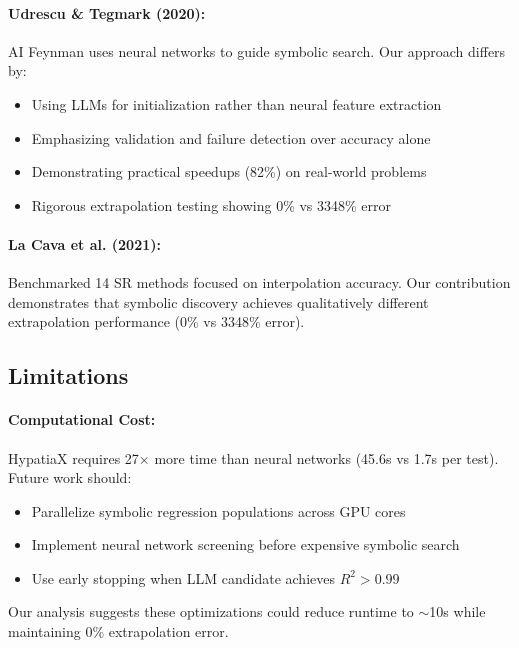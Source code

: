 \documentclass[twoside,11pt]{article}
\begin{document}
\paragraph{Udrescu \& Tegmark (2020):} AI Feynman uses neural networks to guide symbolic search. Our approach differs by:
\begin{itemize}
\item Using LLMs for initialization rather than neural feature extraction
\item Emphasizing validation and failure detection over accuracy alone
\item Demonstrating practical speedups (82\%) on real-world problems
\item Rigorous extrapolation testing showing 0\% vs 3348\% error
\end{itemize}

\paragraph{La Cava et al. (2021):} Benchmarked 14 SR methods focused on interpolation accuracy. Our contribution demonstrates that symbolic discovery achieves qualitatively different extrapolation performance (0\% vs 3348\% error).


\subsection{Limitations}

\paragraph{Computational Cost:} HypatiaX requires 27$\times$ more time than neural networks (45.6s vs 1.7s per test). Future work should:
\begin{itemize}
\item Parallelize symbolic regression populations across GPU cores
\item Implement neural network screening before expensive symbolic search
\item Use early stopping when LLM candidate achieves $R^2 > 0.99$
\end{itemize}

Our analysis suggests these optimizations could reduce runtime to $\sim$10s while maintaining 0\% extrapolation error.
\end{document}
